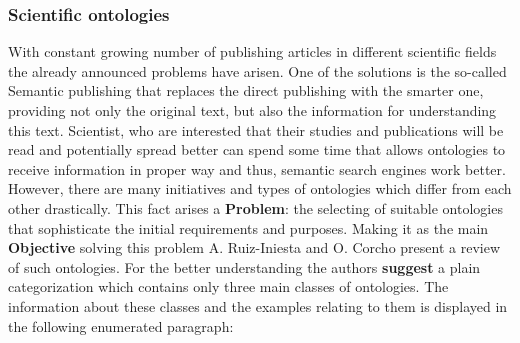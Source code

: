 		\subsubsection{Scientific ontologies}
		With constant growing number of publishing articles in different scientific fields the already announced problems have arisen. One of the solutions is the so-called Semantic publishing that replaces the direct publishing with the smarter one, providing not only the original text, but also the information for understanding this text. Scientist, who are interested that their studies and publications will be read and potentially spread better can spend some time that allows ontologies to receive information in proper way and thus, semantic search engines work better. However, there are many initiatives and types of ontologies which differ from each other drastically. This fact arises a \textbf{Problem}: the selecting of suitable ontologies that sophisticate the initial requirements and purposes. Making it as the main \textbf{Objective} solving this problem A. Ruiz-Iniesta and O. Corcho present a review of such ontologies\cite{Cor14}.
		For the better understanding the authors \textbf{suggest} a plain categorization which contains only three main classes of ontologies. The information about these classes and the examples relating to them is displayed in the following enumerated paragraph:
